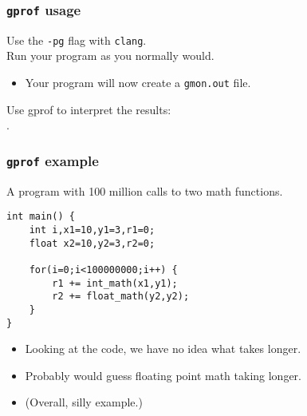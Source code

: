 \begin{frame}
  \frametitle{{\tt gprof} usage}

  
\large
\begin{changemargin}{1.5cm}
\vspace*{-3em}
    Use the {\tt -pg} flag with {\tt clang}.\\[1em]
    Run your program as you normally would.
      \begin{itemize}
        \item Your program will now create a {\tt gmon.out} file.
      \end{itemize}

    Use gprof to interpret the results:\\
 .
    \end{changemargin}
\end{frame}

\begin{frame}[fragile]
  \frametitle{{\tt gprof} example}

  
\large
\begin{changemargin}{1.5cm}
    A program with 100 million calls to two math functions.

  \begin{lstlisting}
int main() {
    int i,x1=10,y1=3,r1=0;
    float x2=10,y2=3,r2=0;

    for(i=0;i<100000000;i++) {
        r1 += int_math(x1,y1);
        r2 += float_math(y2,y2);
    }
}
  \end{lstlisting}

  \begin{itemize}
    \item Looking at the code, we have no idea what takes longer.
    \item Probably would guess floating point math taking longer.
    \item (Overall, silly example.)
  \end{itemize}
  \end{changemargin}
\end{frame}

